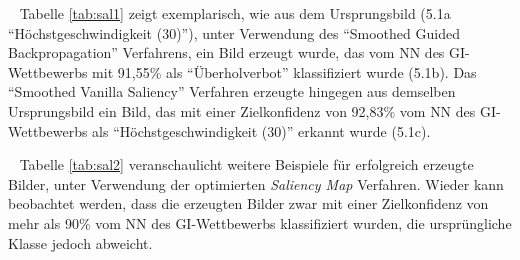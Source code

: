 ~\newline
Tabelle \ref{tab:sal1} zeigt exemplarisch, wie aus dem Ursprungsbild (5.1a "`Höchstgeschwindigkeit (30)"'), unter Verwendung des "`Smoothed Guided Backpropagation"' Verfahrens, ein Bild erzeugt wurde, das vom \ac{NN} des \ac{GI}-Wettbewerbs mit 91,55\% als "`Überholverbot"' klassifiziert wurde (5.1b). 
Das "`Smoothed Vanilla Saliency"' Verfahren erzeugte hingegen aus demselben Ursprungsbild ein Bild, das mit einer Zielkonfidenz von 92,83\% vom \ac{NN} des \ac{GI}-Wettbewerbs als "`Höchstgeschwindigkeit (30)"' erkannt wurde (5.1c).


~\newline
Tabelle \ref{tab:sal2} veranschaulicht weitere Beispiele für erfolgreich erzeugte Bilder, unter Verwendung der optimierten \textit{Saliency Map} Verfahren. Wieder kann beobachtet werden, dass die erzeugten Bilder zwar mit einer Zielkonfidenz von mehr als 90\% vom \ac{NN} des \ac{GI}-Wettbewerbs klassifiziert wurden, die ursprüngliche Klasse jedoch abweicht.

